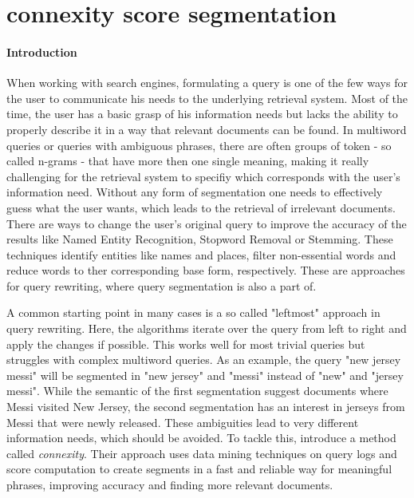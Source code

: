 \section{connexity score segmentation} \label{approach1}

\paragraph*{Introduction}
When working with search engines, formulating a query is one of the few ways for the user to communicate his needs to the underlying retrieval system. Most of the time, the user has a basic grasp of his information needs but lacks the ability to properly describe it in a way that relevant documents can be found. In multiword queries or queries with ambiguous phrases, there are often groups of token - so called n-grams - that have more then one single meaning, making it really challenging for the retrieval system to specifiy which corresponds with the user's information need. Without any form of segmentation one needs to effectively guess what the user wants, which leads to the retrieval of irrelevant documents. 
There are ways to change the user's original query to improve the accuracy of the results like Named Entity Recognition, Stopword Removal or Stemming.
These techniques identify entities like names and places, filter non-essential words and reduce words to ther corresponding base form, respectively. These are approaches for query rewriting, where query segmentation is also a part of.

A common starting point in many cases is a so called "leftmost" approach in query rewriting. Here, the algorithms iterate over the query from left to right and apply the changes if possible. This works well for most trivial queries but struggles with complex multiword queries. As an example, the query "new jersey messi" will be segmented in "new jersey" and "messi" instead of "new" and "jersey messi". While the semantic of the first segmentation suggest documents where Messi visited New Jersey, the second segmentation has an interest in jerseys from Messi that were newly released.
These ambiguities lead to very different information needs, which should be avoided. To tackle this, \citeauthor{Risvik:2003} introduce a method called \textit{connexity}. Their approach uses data mining techniques on query logs and score computation to create segments in a fast and reliable way for meaningful phrases, improving accuracy and finding more relevant documents.

